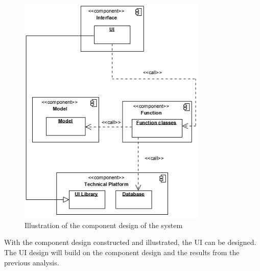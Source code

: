 \begin{figure}[H]
    \centering
    \includegraphics[width=0.8\textwidth]{figures/ComponentDiagrams/ComponentDesignOverview.png}
    \caption{Illustration of the component design of the system}
    \label{fig:FinalComponentDesign}
\end{figure}


With the component design constructed and illustrated, the UI can be designed. The UI design will build on the component design and the results from the previous analysis.